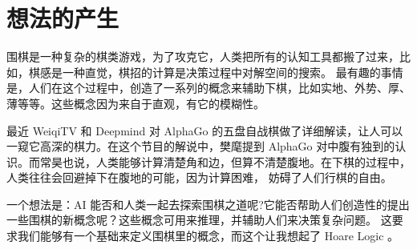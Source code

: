 \section{想法的产生}

围棋是一种复杂的棋类游戏，为了攻克它，人类把所有的认知工具都搬了过来，比如，棋感是一种直觉，棋招的计算是决策过程中对解空间的搜索。
最有趣的事情是，人们在这个过程中，创造了一系列的概念来辅助下棋，比如实地、外势、厚、薄等等。这些概念因为来自于直观，有它的模糊性。

最近 WeiqiTV 和 Deepmind 对 AlphaGo 的五盘自战棋做了详细解读，让人可以一窥它高深的棋力。在这个节目的解说中，樊麾提到 AlphaGo
对中腹有独到的认识。而常昊也说，人类能够计算清楚角和边，但算不清楚腹地。在下棋的过程中，人类往往会回避掉下在腹地的可能，因为计算困难，
妨碍了人们行棋的自由。

一个想法是：AI 能否和人类一起去探索围棋之道呢?它能否帮助人们创造性的提出一些围棋的新概念呢？这些概念可用来推理，并辅助人们来决策复杂问题。
这要求我们能够有一个基础来定义围棋里的概念，而这个让我想起了 Hoare Logic 。










